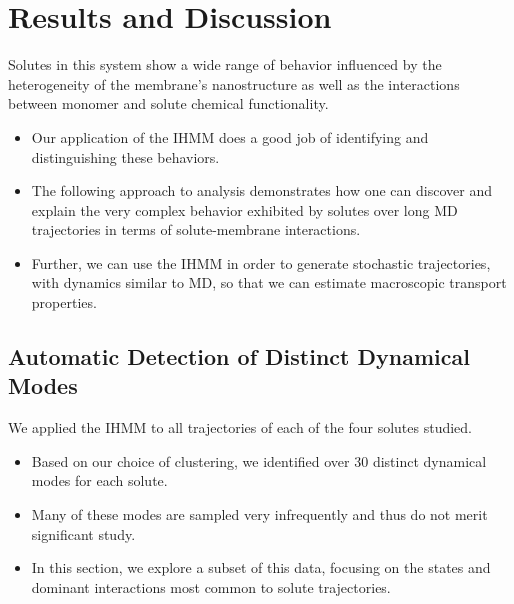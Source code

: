 \documentclass{article}
\begin{document}
  \section{Results and Discussion}
  
  Solutes in this system show a wide range of behavior influenced by the 
  heterogeneity of the membrane's nanostructure as well as the interactions 
  between monomer and solute chemical functionality. 
  \begin{itemize}  
  	\item Our application of the IHMM does a good job of identifying and
  	distinguishing these behaviors.   	
  	\item The following approach to analysis demonstrates how one can discover and explain the very complex behavior exhibited by solutes over long MD trajectories 
   in terms of solute-membrane interactions.
	\item Further, we can use the IHMM in order to generate stochastic trajectories,
	with dynamics similar to MD, so that we can estimate macroscopic transport
	properties.
  \end{itemize}  	

  \subsection{Automatic Detection of Distinct Dynamical Modes}\label{section:find_modes}
  
  
  We applied the IHMM to all trajectories of each of the four solutes studied.
  \begin{itemize}
    \item Based on our choice of clustering, we identified over 30 distinct dynamical
    modes for each solute.
    \item Many of these modes are sampled very infrequently and thus do not merit significant study.
    \item In this section, we explore a subset of this data, focusing on the states
    and dominant interactions most common to solute trajectories. 
  \end{itemize}  
  
\end{document}
